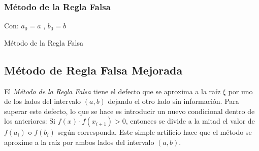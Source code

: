 \subsubsection{Método de la Regla Falsa}
\begin{algorithm}[ht]
  Con: 
  $a_0=a$ ,
  $b_0=b$\\
 \caption{Método de la Regla Falsa}
\end{algorithm}
\subsection{Método de Regla Falsa Mejorada}
El \textit{Método de la Regla Falsa} tiene el defecto que se aproxima a la raíz $\xi$ por uno de los lados del intervalo $(a,b)$  dejando el otro lado sin información.
\salto
Para superar este defecto, lo que se hace es introducir un nuevo condicional dentro de los anteriores:
\salto
Si $f(x)\cdot f(x_{i+1})>0$, entonces se divide a la mitad el valor de $f(a_i)$ o $f(b_i)$ según corresponda.
\salto
Este simple artificio hace que el método se aproxime a la raíz por ambos lados del intervalo $(a,b)$.
